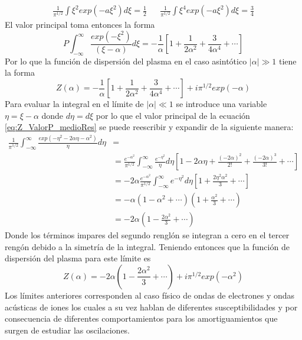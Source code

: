 \documentclass[../tesis_main_file.tex]{subfiles}
\begin{document}
\begin{align*}
\frac{1}{\pi ^{1/2}}\int \xi ^2 exp(-a\xi ^2)d\xi =\frac{1}{2}& &\frac{1}{\pi ^{1/2}}\int \xi ^4 exp(-a\xi ^2)d\xi =\frac{3}{4}
\end{align*}
El valor principal toma entonces la forma 
\begin{equation}
\label{eq:ValorP_alpha_gg_1}
P\int ^{\infty}_{-\infty} \frac{exp(-\xi ^2)}{(\xi -\alpha)}d\xi = -\frac{1}{\alpha}\left[1 + \frac{1}{2\alpha^2}+\frac{3}{4\alpha^4}+\cdots\right]
\end{equation}
Por lo que la función de dispersión del plasma en el caso asintótico $|\alpha|\gg 1$ tiene la forma
\begin{equation}
\label{eq:Z_aprox_alpha_gg_1}
Z(\alpha)= -\frac{1}{\alpha}\left[1 + \frac{1}{2\alpha^2}+\frac{3}{4\alpha^4}+\cdots\right]+ i\pi ^{1/2}exp(-\alpha)
\end{equation}
Para evaluar la integral en el límite de $|\alpha |\ll 1$ se introduce una variable $\eta = \xi -\alpha$ donde $d\eta = d\xi$ por lo que el valor principal de la ecuación \ref{eq:Z_ValorP_medioRes} se puede reescribir y expandir de la siguiente manera:
\begin{equation}
\begin{split}
\frac{1}{\pi^{1/2}}\int^{\infty}_{-\infty}\frac{exp(-\eta ^2 - 2\alpha \eta - \alpha^2 )}{\eta}d\eta &=\\
&=\frac{e^{-\alpha^2}}{\pi^{1/2}}\int^{\infty}_{-\infty}\frac{e^{-\eta^2}}{\eta}d\eta \left[1-2\alpha \eta + \frac{(-2\alpha)^2}{2!}+\frac{(-2\alpha)^3}{3!}+\cdots\right]\\
&=-2\alpha\frac{e^{-\alpha^2}}{\pi^{1/2}}\int^{\infty}_{-\infty}e^{-\eta^2}d\eta\left[1+\frac{2\eta^2\alpha^2}{3}+\cdots\right]\\
&=-\alpha \left(1-\alpha^2+\cdots\right)\left(1+\frac{\alpha^2}{3}+\cdots\right)\\
&=-2\alpha \left(1-\frac{2\alpha^2}{3} + \cdots \right)
\end{split}
\end{equation}
Donde los términos impares del segundo renglón se integran a cero en el tercer rengón debido a la simetría de la integral.
Teniendo entonces que la función de dispersión del plasma para este límite es
\begin{equation}
\label{eq:Z_aprox_alpha_ll_1}
Z(\alpha)=-2\alpha \left(1-\frac{2\alpha^2}{3}+\cdots \right)+i\pi^{1/2}exp(-\alpha^2)
\end{equation}
Los límites anteriores corresponden al caso físico de ondas de electrones y ondas acústicas de iones los cuales a su vez hablan de diferentes susceptibilidades y por consecuencia de diferentes comportamientos para los amortiguamientos que surgen de estudiar las oscilaciones.
\end{document}
